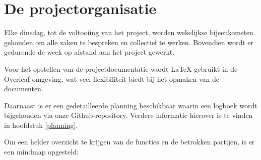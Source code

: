 \section{De projectorganisatie}
Elke dinsdag, tot de voltooiing van het project, worden wekelijkse bijeenkomsten gehouden om alle zaken te bespreken en collectief te werken. Bovendien wordt er gedurende de week op afstand aan het project gewerkt.

Voor het opstellen van de projectdocumentatie wordt LaTeX gebruikt in de Overleaf-omgeving, wat veel flexibiliteit biedt bij het opmaken van de documenten.

Daarnaast is er een gedetailleerde planning beschikbaar waarin een logboek wordt bijgehouden via onze Github-repository. Verdere informatie hierover is te vinden in hoofdstuk \ref{planning}.

Om een helder overzicht te krijgen van de functies en de betrokken partijen, is er een mindmap opgesteld:%



\vspace{1cm} 
\begin{minipage}[t][][b]{\linewidth}
  
\end{minipage}